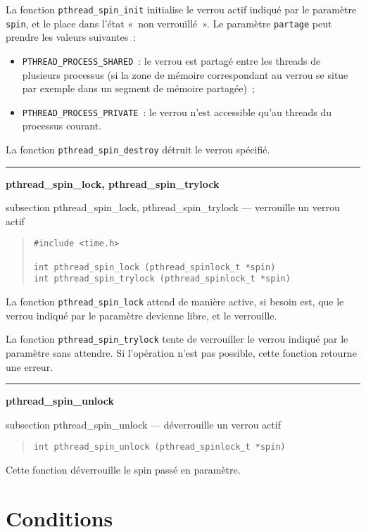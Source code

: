 \documentclass [twoside] {report}
\newcommand {\primitive} [1]
    {
	\phantomsection
	{\large \bf #1}
	\addcontentsline {toc} {subsection} {#1}
    }
\newcommand {\separation}
    {
	\vspace {5mm}
	\nopagebreak
	\hrule
    }
\begin{document}
La fonction \verb|pthread_spin_init| initialise le verrou actif indiqué
par le paramètre \texttt {spin}, et le place dans l'état «~non
verrouillé~».  Le paramètre \texttt {partage} peut prendre les
valeurs suivantes~:

\begin {itemize}
    \item \verb|PTHREAD_PROCESS_SHARED|~: le verrou
	est partagé entre les threads de plusieurs processus (si la zone
	de mémoire correspondant au verrou se situe par exemple dans un
	segment de mémoire partagée)~;
    \item \verb|PTHREAD_PROCESS_PRIVATE|~: le verrou n'est accessible
	qu'au threads du processus courant.
\end {itemize}

La fonction \verb|pthread_spin_destroy| détruit le verrou spécifié.


\separation
\primitive {pthread\_spin\_lock, pthread\_spin\_trylock} --- verrouille un verrou actif

\begin {quote}
\begin {verbatim}
#include <time.h>

int pthread_spin_lock (pthread_spinlock_t *spin)
int pthread_spin_trylock (pthread_spinlock_t *spin)
\end{verbatim}
\end {quote}

La fonction \verb|pthread_spin_lock| attend de manière active, si
besoin est, que le verrou indiqué par le paramètre devienne libre,
et le verrouille.

La fonction \verb|pthread_spin_trylock| tente de verrouiller le verrou
indiqué par le paramètre sans attendre. Si l'opération n'est pas
possible, cette fonction retourne une erreur.



\separation
\primitive {pthread\_spin\_unlock} --- déverrouille un verrou actif

\begin {quote}
\begin {verbatim}
int pthread_spin_unlock (pthread_spinlock_t *spin)
\end{verbatim}
\end {quote}

Cette fonction déverrouille le spin passé en paramètre.


\section {Conditions}
\end{document}
